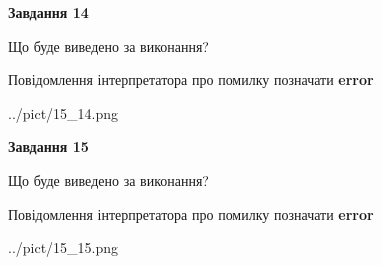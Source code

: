 \documentclass[11pt, ukrainian]{article}
\begin{document}
{\begin {large}
{\begin {center}\textbf{Завдання 14}\end {center}}\par
Що буде виведено за виконання? \par
Повідомлення інтерпретатора про помилку позначати \textbf{error}

\begin{center}
	{../pict/15_14.png}
\end{center}
\newpage

{\begin {center}\textbf{Завдання 15}\end {center}}\par
Що буде виведено за виконання? \par
Повідомлення інтерпретатора про помилку позначати \textbf{error}

\begin{center}
	{../pict/15_15.png}
\end{center}
\newpage

\end {large}}
\end{document}
